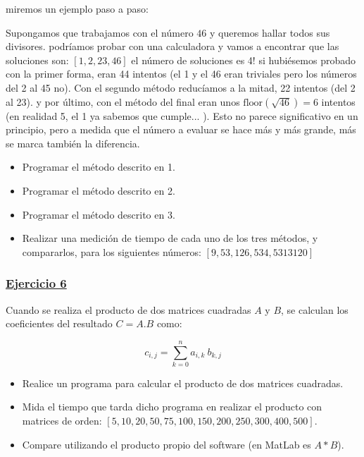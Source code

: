\documentclass[a4paper,11pt]{article}
\theoremstyle{mytheor}
\begin{document}
 miremos un ejemplo paso a paso:

Supongamos que trabajamos con el número $46$ y queremos hallar todos sus divisores. podríamos probar con una calculadora y vamos a encontrar que las soluciones son: $[1, 2, 23, 46]$ el número de soluciones es 4! si hubiésemos probado con la primer forma, eran 44 intentos (el 1 y el 46 eran triviales pero los números del 2 al 45 no). Con el segundo método reducíamos a la mitad, 22 intentos (del 2 al 23). y por último, con el método del final eran unos $\text{floor} (\sqrt{46}) = 6$ intentos (en realidad 5, el 1 ya sabemos que cumple... ).  Esto no parece significativo en un principio, pero a medida que el número a evaluar se hace más y más grande, más se marca también la diferencia.


\begin{itemize}
\item Programar el método descrito en 1.
\item Programar el método descrito en 2.
\item Programar el método descrito en 3.
\item Realizar una medición de tiempo de cada uno de los tres métodos, y compararlos, para los siguientes números: $[9 , 53, 126,534,5313120]$

\end{itemize}




\subsubsection*{\underline{Ejercicio 6}}

Cuando se realiza el producto de dos matrices cuadradas $A$ y $B$, se calculan los coeficientes del resultado $C=A . B$ como:

$$c_{i,j} = \sum_{k=0}^n a_{i,k}\  b_{k,j}$$

\begin{itemize}
\item Realice un programa para calcular el producto de dos matrices cuadradas. 
\item Mida el tiempo que tarda dicho programa en realizar el producto con matrices de orden: $[5,10,20,50,75,100,150,200,250,300,400,500]$.
\item Compare utilizando el producto propio del software (en MatLab es $A*B$).
\end{itemize}
\end{document}
